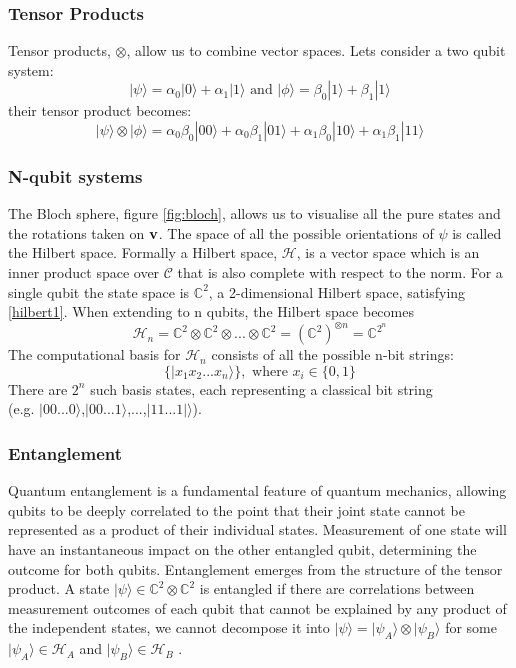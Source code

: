 \documentclass[12pt]{article}
\numberwithin{equation}{section}
\begin{document}
\subsubsection{Tensor Products}
Tensor products, $\otimes$, allow us to combine vector spaces. Lets consider 
a two qubit system:
\begin{equation}
  |\psi\rangle = \alpha_0|0\rangle + \alpha_1|1\rangle \text{  and  }
  |\phi\rangle = \beta_0|1\rangle  + \beta_1|1\rangle
\end{equation}
their tensor product becomes:
\begin{equation}
  |\psi\rangle \otimes |\phi\rangle = 
  \alpha_0\beta_0|00\rangle + 
  \alpha_0\beta_1|01\rangle + 
  \alpha_1\beta_0|10\rangle + 
  \alpha_1\beta_1|11\rangle  
\end{equation}
\subsubsection{N-qubit systems}
The Bloch sphere, figure \ref{fig:bloch}, allows us to visualise all the pure states and the rotations taken 
on $\bold{v}$. 
The space of all the possible orientations of $\psi$ is called the Hilbert space. 
Formally a Hilbert space, $\mathcal{H}$, is a vector space which is an inner product space 
over $\mathcal{C}$ that is also complete with respect to the norm\autocite{a2007_lecture}. For a single 
qubit the state space is $\mathbb{C}^2$, a 2-dimensional Hilbert space, satisfying 
\ref{hilbert1}. When extending to n qubits, the Hilbert space becomes 
\begin{equation}
  \mathcal{H}_n = \mathbb{C}^2 \otimes \mathbb{C}^2 \otimes ... \otimes \mathbb{C}^2 
  =(\mathbb{C}^2)^{\otimes n} = \mathbb{C}^{2^n}
\end{equation}
The computational basis for $\mathcal{H}_n$ consists of all the possible n-bit strings:
\begin{equation}
  \{|x_1x_2...x_n\rangle\}, \text{ where } x_i \in \{0,1\}
\end{equation}
There are $2^n$ such basis states, each representing a classical bit string\\
(e.g. $|00...0\rangle$,$|00...1\rangle$,...,$|11...1|\rangle$). 

\subsubsection{Entanglement}
Quantum entanglement is a fundamental feature of quantum mechanics, allowing 
qubits to be deeply correlated to the point that their joint state cannot be represented 
as a product of their individual states. Measurement of one state will have an 
instantaneous impact on the other entangled qubit, determining the outcome for both 
qubits. 
Entanglement emerges from the structure of the tensor product. A state 
$|\psi\rangle \in \mathbb{C}^2 \otimes \mathbb{C}^2$ is entangled if there are 
correlations between measurement outcomes of each qubit that cannot be explained
by any product of the independent states, we cannot decompose it into 
$|\psi\rangle = |\psi_A\rangle \otimes |\psi_B\rangle$ for some $|\psi_A\rangle \in \mathcal{H}_A$
and $|\psi_B\rangle \in \mathcal{H}_B$ \autocite{nielsen_2010_quantum,dickson_2007_nonrelativistic}.
\end{document}
